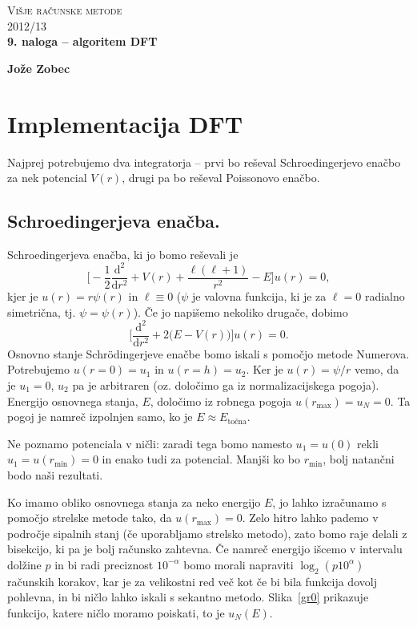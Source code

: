 \documentclass[12pt, a4 paper]{article}
\renewcommand{\d}{
	\ensuremath{\mathrm{d}}
}
\begin{document}
\begin{center}
\textsc{Vi\v sje ra\v cunske metode}\\
\textsc{2012/13}\\[0.5cm]
\textbf{9. naloga -- algoritem DFT}
\end{center}
\begin{flushright}
\textbf{Jo\v ze Zobec}
\end{flushright}

\section{Implementacija DFT}

Najprej potrebujemo dva integratorja -- prvi bo re\v seval Schroedingerjevo ena\v cbo za nek potencial $V(r)$, drugi
pa bo re\v seval Poissonovo ena\v cbo.

\subsection{Schroedingerjeva ena\v cba.}

Schroedingerjeva ena\v cba, ki jo bomo re\v sevali je
\[
	\bigg[-\frac{1}{2}\frac{\d^2}{\d r^2} + V(r) + \frac{\ell(\ell+1)}{r^2} - E\bigg]u(r) = 0,
\]
kjer je $u(r) = r\psi(r)$ in $\ell \equiv 0$ ($\psi$ je valovna funkcija, ki je za $\ell = 0$ radialno simetri\v cna, tj.
$\psi = \psi(r)$). \v Ce jo napi\v semo nekoliko druga\v ce, dobimo
\begin{equation}
	\bigg[\frac{\d^2}{\d r^2} + 2\Big(E - V(r)\Big)\bigg]u(r) = 0.
\end{equation}
Osnovno stanje Schr\" odingerjeve ena\v cbe bomo iskali s pomo\v cjo metode Numerova. Potrebujemo $u(r=0) = u_1$ in
$u (r = h) = u_2$. Ker je $u(r) = \psi/r$ vemo, da je $u_1 = 0$, $u_2$ pa je arbitraren (oz. dolo\v cimo ga iz
normalizacijskega pogoja). Energijo osnovnega stanja, $E$, dolo\v cimo iz robnega pogoja $u(r_\text{max}) = u_N = 0$. Ta
pogoj je namre\v c izpolnjen samo, ko je $E \approx E_\text{to\v cna}$.

Ne poznamo potenciala v ni\v cli: zaradi tega bomo namesto $u_1 = u(0)$ rekli $u_1 = u(r_\text{min}) = 0$ in enako tudi
za potencial. Manj\v si ko bo $r_\text{min}$, bolj natan\v cni bodo na\v si rezultati.

Ko imamo obliko osnovnega stanja za neko energijo $E$, jo lahko izra\v cunamo s pomo\v cjo strelske metode
tako, da $u(r_\text{max}) = 0$. Zelo hitro lahko pademo v podro\v cje sipalnih stanj (\v ce uporabljamo strelsko
metodo), zato bomo raje delali z bisekcijo, ki pa je bolj ra\v cunsko zahtevna. \v Ce namre\v c energijo i\v scemo v intervalu
dol\v zine $p$ in bi radi preciznost $10^{-\alpha}$ bomo morali napraviti $\log_2(p 10^\alpha)$ ra\v cunskih korakov, kar
je za velikostni red ve\v c kot \v ce bi bila funkcija dovolj pohlevna, in bi ni\v clo lahko iskali s sekantno metodo.
Slika~\ref{gr0} prikazuje funkcijo, katere ni\v clo moramo poiskati, to je $u_N(E)$.
\end{document}
